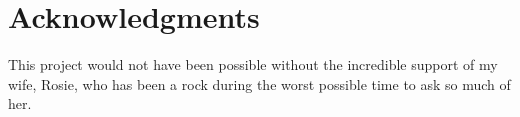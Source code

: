 \newpage
\vspace*{\fill}
\section*{Acknowledgments}


This project would not have been possible without the incredible support of my wife, Rosie, who has been a rock during the worst possible time to ask so much of her.

\vspace*{\fill}
